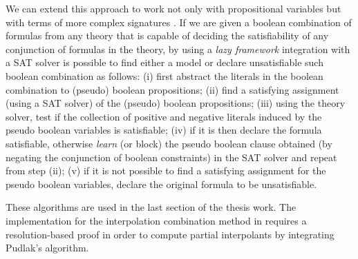 We can extend this approach to work not only with propositional
variables but with terms of more complex signatures 
\cite{10.5555/1391237}. If we are given a boolean combination 
of formulas from any theory that is capable of deciding the 
satisfiability of any conjunction of formulas in the theory, 
by using a \emph{lazy framework} integration with a SAT solver is 
possible to find either a model or declare unsatisfiable such boolean
combination as follows: (i) first abstract the literals in the boolean
combination to (pseudo) boolean propositions; (ii) find a satisfying
assignment (using a SAT solver) of the (pseudo) boolean propositions;
(iii) using the theory solver, test if the collection of positive
and negative literals induced by the pseudo boolean variables is
satisfiable; (iv) if it is then declare the formula satisfiable, 
otherwise \emph{learn} (or block) the pseudo boolean clause obtained
(by negating the conjunction of boolean constraints) in the SAT
solver and repeat from step (ii); (v) if it is not possible to
find a satisfying assignment for the pseudo boolean variables, 
declare the original formula to be unsatisfiable.

These algorithms are used in the last section of the thesis work.
The implementation for the interpolation combination method
in \cite{10.1007/11532231_26} requires a resolution-based
proof in order to compute partial interpolants by integrating
Pudlak's algorithm.
 
